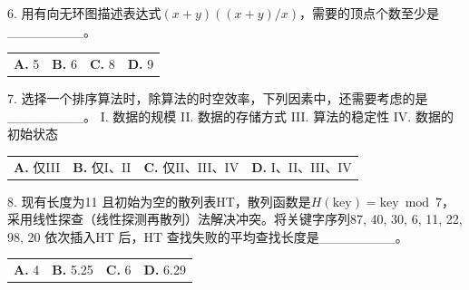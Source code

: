 \documentclass[UTF8,11pt]{ctexart}
\begin{document}
6. 用有向无环图描述表达式\(\displaystyle (x+y)((x+y)/x)\)，需要的顶点个数至少是\_\_\_\_\_\_\_\_。


\begin{center}\begin{tabular}{>{\raggedright\arraybackslash}p{\dimexpr(\linewidth-8\tabcolsep)/4\relax}>{\raggedright\arraybackslash}p{\dimexpr(\linewidth-8\tabcolsep)/4\relax}>{\raggedright\arraybackslash}p{\dimexpr(\linewidth-8\tabcolsep)/4\relax}>{\raggedright\arraybackslash}p{\dimexpr(\linewidth-8\tabcolsep)/4\relax}}
\textbf{A.} 5 & \textbf{B.} 6 & \textbf{C.} 8 & \textbf{D.} 9\\[.35em]\end{tabular}\end{center}

7. 选择一个排序算法时，除算法的时空效率，下列因素中，还需要考虑的是\_\_\_\_\_\_\_\_。 I. 数据的规模 II. 数据的存储方式 III. 算法的稳定性 IV. 数据的初始状态


\begin{center}\begin{tabular}{>{\raggedright\arraybackslash}p{\dimexpr(\linewidth-8\tabcolsep)/4\relax}>{\raggedright\arraybackslash}p{\dimexpr(\linewidth-8\tabcolsep)/4\relax}>{\raggedright\arraybackslash}p{\dimexpr(\linewidth-8\tabcolsep)/4\relax}>{\raggedright\arraybackslash}p{\dimexpr(\linewidth-8\tabcolsep)/4\relax}}
\textbf{A.} 仅III & \textbf{B.} 仅I、II & \textbf{C.} 仅II、III、IV & \textbf{D.} I、II、III、IV\\[.35em]\end{tabular}\end{center}

8. 现有长度为11 且初始为空的散列表HT，散列函数是\(\displaystyle H(\mathrm{key})=\mathrm{key}\bmod 7\)，采用线性探查（线性探测再散列）法解决冲突。将关键字序列87, 40, 30, 6, 11, 22, 98, 20 依次插入HT 后，HT 查找失败的平均查找长度是\_\_\_\_\_\_\_\_。


\begin{center}\begin{tabular}{>{\raggedright\arraybackslash}p{\dimexpr(\linewidth-8\tabcolsep)/4\relax}>{\raggedright\arraybackslash}p{\dimexpr(\linewidth-8\tabcolsep)/4\relax}>{\raggedright\arraybackslash}p{\dimexpr(\linewidth-8\tabcolsep)/4\relax}>{\raggedright\arraybackslash}p{\dimexpr(\linewidth-8\tabcolsep)/4\relax}}
\textbf{A.} 4 & \textbf{B.} 5.\allowbreak{}25 & \textbf{C.} 6 & \textbf{D.} 6.\allowbreak{}29\\[.35em]\end{tabular}\end{center}
\end{document}
